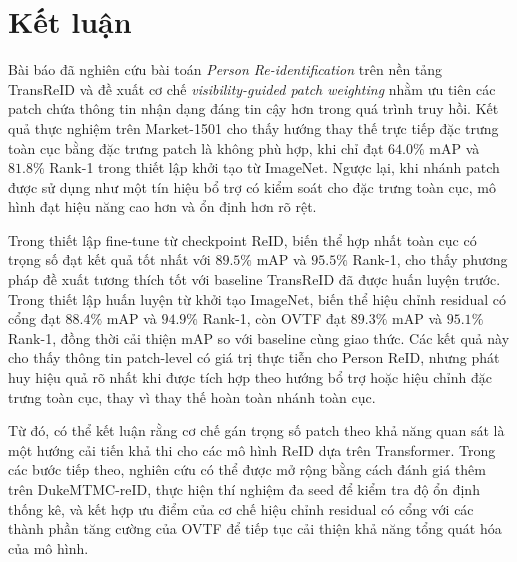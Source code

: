 \section{Kết luận}

Bài báo đã nghiên cứu bài toán \textit{Person Re-identification} trên nền tảng
TransReID và đề xuất cơ chế \textit{visibility-guided patch weighting} nhằm ưu
tiên các patch chứa thông tin nhận dạng đáng tin cậy hơn trong quá trình truy
hồi. Kết quả thực nghiệm trên Market-1501 cho thấy hướng thay thế trực tiếp đặc
trưng toàn cục bằng đặc trưng patch là không phù hợp, khi chỉ đạt $64.0\%$ mAP
và $81.8\%$ Rank-1 trong thiết lập khởi tạo từ ImageNet. Ngược lại, khi nhánh
patch được sử dụng như một tín hiệu bổ trợ có kiểm soát cho đặc trưng toàn cục,
mô hình đạt hiệu năng cao hơn và ổn định hơn rõ rệt.

Trong thiết lập fine-tune từ checkpoint ReID, biến thể hợp nhất toàn cục có
trọng số đạt kết quả tốt nhất với $89.5\%$ mAP và $95.5\%$ Rank-1, cho thấy
phương pháp đề xuất tương thích tốt với baseline TransReID đã được huấn luyện
trước. Trong thiết lập huấn luyện từ khởi tạo ImageNet, biến thể hiệu chỉnh
residual có cổng đạt $88.4\%$ mAP và $94.9\%$ Rank-1, còn OVTF đạt $89.3\%$
mAP và $95.1\%$ Rank-1, đồng thời cải thiện mAP so
với baseline cùng giao thức. Các kết quả này cho thấy thông tin patch-level có
giá trị thực tiễn cho Person ReID, nhưng phát huy hiệu quả rõ nhất khi được
tích hợp theo hướng bổ trợ hoặc hiệu chỉnh đặc trưng toàn cục, thay vì thay thế
hoàn toàn nhánh toàn cục.

Từ đó, có thể kết luận rằng cơ chế gán trọng số patch theo khả năng quan sát là
một hướng cải tiến khả thi cho các mô hình ReID dựa trên Transformer. Trong các
bước tiếp theo, nghiên cứu có thể được mở rộng bằng cách đánh giá thêm trên
DukeMTMC-reID, thực hiện thí nghiệm đa seed để kiểm tra độ ổn định thống kê, và
kết hợp ưu điểm của cơ chế hiệu chỉnh residual có cổng với các thành phần tăng
cường của OVTF để tiếp tục cải thiện khả năng tổng quát hóa của mô hình.
